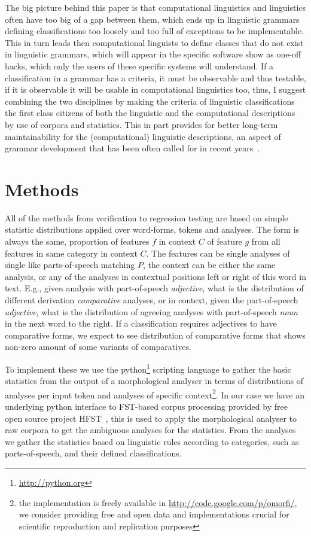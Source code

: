 \documentclass[a5paper]{article}
\begin{document}
The big picture behind this paper is that computational linguistics and
linguistics often have too big of a gap between them, which ends up in
linguistic grammars defining classifications too loosely and too full of
exceptions to be implementable. This in turn leads then computational linguists
to define classes that do not exist in linguistic grammars, which will appear
in the specific software show as one-off hacks, which only the users of these
specific systems will understand. If a classification in a grammar has a
criteria, it must be observable and thus testable, if it is observable it will
be usable in computational linguistics too, thus, I suggest combining the two
disciplines by making the criteria of linguistic classifications the first
class citizens of both the linguistic and the computational descriptions by use
of corpora and statistics.  This in part provides for better long-term
maintainability for the (computational) linguistic descriptions, an aspect of
grammar development that has been often called for in recent years~\cite{maxwell2013system,maxwell2008joint,moshagen2013building,pirinen2011modularisation}.

\section{Methods}

All of the methods from verification to regression testing are based on simple
statistic distributions applied over word-forms, tokens and analyses. The form
is always the same, proportion of features $f$ in context $C$ of feature $g$ 
from all features in same category in context $C$. The features can be 
single analyses of single like parts-of-speech matching $P$, the context can
be either the same analysis, or any of the analyses in contextual positions
left or right of this word in text. E.g., given analysis with part-of-speech
\emph{adjective}, what is the distribution of different derivation
\emph{comparative} analyses, or in context, given the part-of-speech
\emph{adjective}, what is the distribution of agreeing analyses with
part-of-speech \emph{noun} in the next word to the right. If a classification
requires adjectives to have comparative forms, we expect to see distribution of
comparative forms that shows non-zero amount of some variants of comparatives.

To implement these we use the python\footnote{\url{http://python.org}}
scripting language to gather the basic statistics from the output of a
morphological analyser in terms of distributions of analyses per input token
and analyses of specific context\footnote{the implementation is freely
available in \url{http://code.google.com/p/omorfi/}, we consider providing free and open data and
implementations crucial for scientific reproduction and replication purposes}.
In our case we have an underlying python interface to FST-based corpus
processing provided by free open source project HFST~\cite{linden2013hfst},
this is used to apply the morphological analyser to raw corpora to get the
ambiguous analyses for the statistics. From the analyses we gather the
statistics based on linguistic rules according to categories, such as
parts-of-speech, and their defined classifications.
\end{document}
